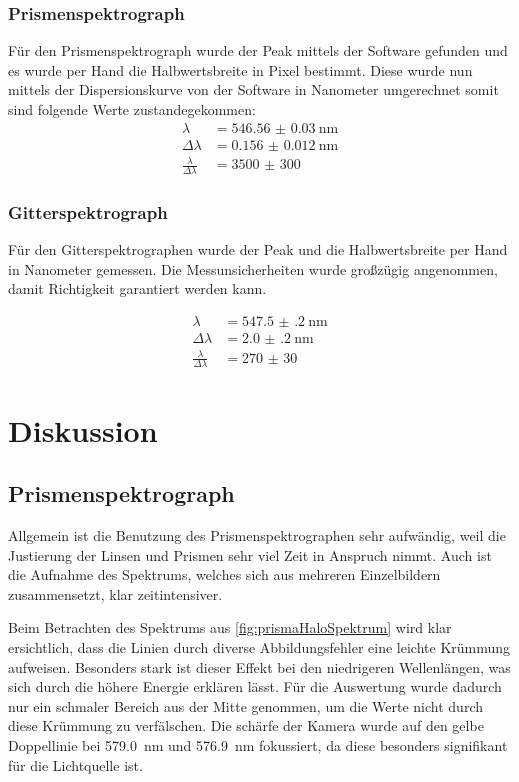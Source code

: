 \documentclass[12pt,english,ngerman]{scrartcl}
\begin{document}
\subsubsection{Prismenspektrograph}
Für den Prismenspektrograph wurde der Peak mittels der Software gefunden und es
wurde per Hand die Halbwertsbreite in Pixel bestimmt. Diese wurde nun mittels
der Dispersionskurve von der Software in Nanometer umgerechnet somit sind
folgende Werte zustandegekommen:
\begin{align*}
	\lambda                       & = \SI{546.56(3)}{\nano\meter} \\
	\Delta \lambda                & = \SI{0.156(12)}{\nano\meter} \\
	\frac{\lambda}{\Delta\lambda} & = \num{3500(300)}
\end{align*}

\subsubsection{Gitterspektrograph}
Für den Gitterspektrographen wurde der Peak und die Halbwertsbreite per Hand in
Nanometer gemessen. Die Messunsicherheiten wurde großzügig angenommen, damit
Richtigkeit garantiert werden kann.

\begin{align*}
	\lambda                       & = \SI{547.5(2)}{\nano\meter} \\
	\Delta \lambda                & = \SI{2.0(2)}{\nano\meter}   \\
	\frac{\lambda}{\Delta\lambda} & = \num{270(30)}
\end{align*}

\section{Diskussion}\label{sec:disk}

\subsection{Prismenspektrograph}

Allgemein ist die Benutzung des Prismenspektrographen sehr aufwändig, weil die
Justierung der Linsen und Prismen sehr viel Zeit in Anspruch nimmt. Auch ist
die Aufnahme des Spektrums, welches sich aus mehreren Einzelbildern
zusammensetzt, klar zeitintensiver.

Beim Betrachten des Spektrums aus \autoref{fig:prismaHaloSpektrum} wird klar
ersichtlich, dass die Linien durch diverse Abbildungsfehler eine leichte
Krümmung aufweisen. Besonders stark ist dieser Effekt bei den niedrigeren
Wellenlängen, was sich durch die höhere Energie erklären lässt. Für die
Auswertung wurde dadurch nur ein schmaler Bereich aus der Mitte genommen, um
die Werte nicht durch diese Krümmung zu verfälschen. Die schärfe der Kamera
wurde auf den gelbe Doppellinie bei \SI{579.0}{\nano\meter} und
\SI{576.9}{\nano\meter} fokussiert, da diese besonders signifikant für die
Lichtquelle ist.
\end{document}
